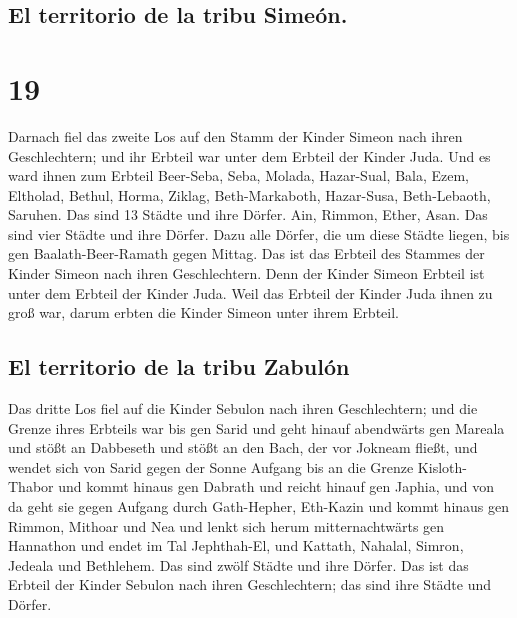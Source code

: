 \hypertarget{el-territorio-de-la-tribu-simeuxf3n.}{%
\subsection{El territorio de la tribu
Simeón.}\label{el-territorio-de-la-tribu-simeuxf3n.}}

\hypertarget{section-18}{%
\section{19}\label{section-18}}

 Darnach fiel das zweite Los auf den Stamm der Kinder
Simeon nach ihren Geschlechtern; und ihr Erbteil war unter dem Erbteil
der Kinder Juda.  Und es ward ihnen zum Erbteil Beer-Seba,
Seba, Molada,  Hazar-Sual, Bala, Ezem, 
Eltholad, Bethul, Horma,  Ziklag, Beth-Markaboth,
Hazar-Susa,  Beth-Lebaoth, Saruhen. Das sind 13 Städte und
ihre Dörfer.  Ain, Rimmon, Ether, Asan. Das sind vier
Städte und ihre Dörfer.  Dazu alle Dörfer, die um diese
Städte liegen, bis gen Baalath-Beer-Ramath gegen Mittag. Das ist das
Erbteil des Stammes der Kinder Simeon nach ihren Geschlechtern.
 Denn der Kinder Simeon Erbteil ist unter dem Erbteil der
Kinder Juda. Weil das Erbteil der Kinder Juda ihnen zu groß war, darum
erbten die Kinder Simeon unter ihrem Erbteil.

\hypertarget{el-territorio-de-la-tribu-zabuluxf3n}{%
\subsection{El territorio de la tribu
Zabulón}\label{el-territorio-de-la-tribu-zabuluxf3n}}

 Das dritte Los fiel auf die Kinder Sebulon nach ihren
Geschlechtern; und die Grenze ihres Erbteils war bis gen Sarid
 und geht hinauf abendwärts gen Mareala und stößt an
Dabbeseth und stößt an den Bach, der vor Jokneam fließt, 
und wendet sich von Sarid gegen der Sonne Aufgang bis an die Grenze
Kisloth-Thabor und kommt hinaus gen Dabrath und reicht hinauf gen
Japhia,  und von da geht sie gegen Aufgang durch
Gath-Hepher, Eth-Kazin und kommt hinaus gen Rimmon, Mithoar und Nea
 und lenkt sich herum mitternachtwärts gen Hannathon und
endet im Tal Jephthah-El,  und Kattath, Nahalal, Simron,
Jedeala und Bethlehem. Das sind zwölf Städte und ihre Dörfer.
 Das ist das Erbteil der Kinder Sebulon nach ihren
Geschlechtern; das sind ihre Städte und Dörfer.

